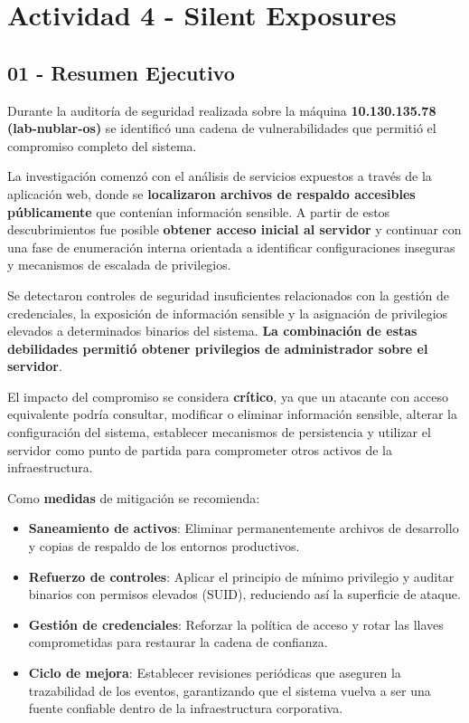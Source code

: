 \documentclass[11pt,a4paper]{article}
\begin{document}
\newpage

\section{Actividad 4 - Silent Exposures}

\subsection{01 - Resumen Ejecutivo}
Durante la auditoría de seguridad realizada sobre la máquina \textbf{10.130.135.78 (lab-nublar-os)} se identificó una cadena de vulnerabilidades que permitió el compromiso completo del sistema.

La investigación comenzó con el análisis de servicios expuestos a través de la aplicación web, donde se \textbf{localizaron archivos de respaldo accesibles públicamente} que contenían información sensible. A partir de estos descubrimientos fue posible \textbf{obtener acceso inicial al servidor} y continuar con una fase de enumeración interna orientada a identificar configuraciones inseguras y mecanismos de escalada de privilegios.

Se detectaron controles de seguridad insuficientes relacionados con la gestión de credenciales, la exposición de información sensible y la asignación de privilegios elevados a determinados binarios del sistema. \textbf{La combinación de estas debilidades permitió obtener privilegios de administrador sobre el servidor}.

El impacto del compromiso se considera \textbf{crítico}, ya que un atacante con acceso equivalente podría consultar, modificar o eliminar información sensible, alterar la configuración del sistema, establecer mecanismos de persistencia y utilizar el servidor como punto de partida para comprometer otros activos de la infraestructura.

Como \textbf{medidas} de mitigación se recomienda:

\begin{itemize}
    \item \textbf{Saneamiento de activos}: Eliminar permanentemente archivos de desarrollo y copias de respaldo de los entornos productivos.
    \item \textbf{Refuerzo de controles}: Aplicar el principio de mínimo privilegio y auditar binarios con permisos elevados (SUID), reduciendo así la superficie de ataque.
    \item \textbf{Gestión de credenciales}: Reforzar la política de acceso y rotar las llaves comprometidas para restaurar la cadena de confianza.
    \item \textbf{Ciclo de mejora}: Establecer revisiones periódicas que aseguren la trazabilidad de los eventos, garantizando que el sistema vuelva a ser una fuente confiable dentro de la infraestructura corporativa.
\end{itemize}
\end{document}
